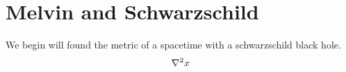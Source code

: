 \documentclass{article}
\begin{document}
\section[]{Melvin and Schwarzschild}
We begin will found the metric of a spacetime with a schwarzschild black hole.
\begin{equation}
\laplacian x
\end{equation}
\end{document}
